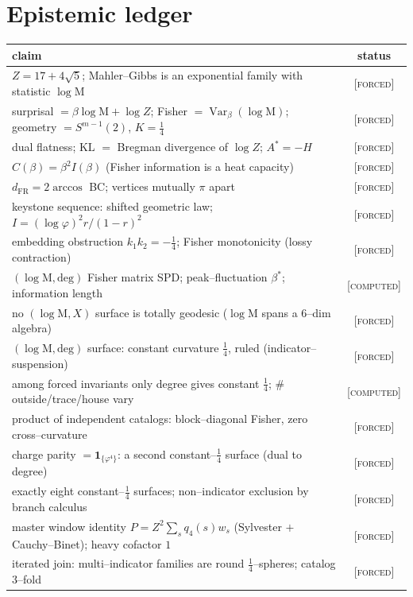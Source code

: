\documentclass[11pt]{article}
\theoremstyle{definition}
\newcommand{\ph}{\varphi}
\newcommand{\Mah}{\mathrm{M}}
\newcommand{\Var}{\operatorname{Var}}
\newcommand{\forcedtag}{{\scshape [forced]}}
\newcommand{\computedtag}{{\scshape [computed]}}
\begin{document}
\section{Epistemic ledger}
\begin{table}[h]\centering
\begin{tabular}{lc}
\toprule
claim & status\\ \midrule
$Z=17+4\sqrt5$; Mahler--Gibbs is an exponential family with statistic $\log\Mah$ & \forcedtag\\
surprisal $=\beta\log\Mah+\log Z$; Fisher $=\Var_\beta(\log\Mah)$; geometry $=S^{m-1}(2)$, $K=\tfrac14$ & \forcedtag\\
dual flatness; $\mathrm{KL}$ $=$ Bregman divergence of $\log Z$; $A^\ast=-H$ & \forcedtag\\
$C(\beta)=\beta^2 I(\beta)$ (Fisher information is a heat capacity) & \forcedtag\\
$d_{\mathrm{FR}}=2\arccos$ BC; vertices mutually $\pi$ apart & \forcedtag\\
keystone sequence: shifted geometric law; $I=(\log\ph)^2 r/(1-r)^2$ & \forcedtag\\
embedding obstruction $k_1k_2=-\tfrac14$; Fisher monotonicity (lossy contraction) & \forcedtag\\
$(\log\Mah,\mathrm{deg})$ Fisher matrix SPD; peak--fluctuation $\beta^\ast$; information length & \computedtag\\
no $(\log\Mah,X)$ surface is totally geodesic ($\log\Mah$ spans a $6$--dim algebra) & \forcedtag\\
$(\log\Mah,\mathrm{deg})$ surface: constant curvature $\tfrac14$, ruled (indicator--suspension) & \forcedtag\\
among forced invariants only degree gives constant $\tfrac14$; $\#$outside/trace/house vary & \computedtag\\
product of independent catalogs: block--diagonal Fisher, zero cross--curvature & \forcedtag\\
charge parity $=\mathbf 1_{\{\ph^4\}}$: a second constant--$\tfrac14$ surface (dual to degree) & \forcedtag\\
exactly eight constant--$\tfrac14$ surfaces; non--indicator exclusion by branch calculus & \forcedtag\\
master window identity $P=Z^2\sum_sq_4(s)w_s$ (Sylvester $+$ Cauchy--Binet); heavy cofactor $1$ & \forcedtag\\
iterated join: multi--indicator families are round $\tfrac14$--spheres; catalog $3$--fold & \forcedtag\\

\end{tabular}
\end{table}
\end{document}
